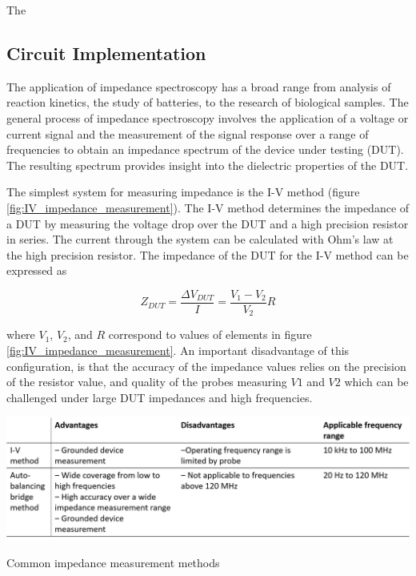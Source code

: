 \par The 
 
 \subsection*{Circuit Implementation}
 \par The application of impedance spectroscopy has a broad range from analysis of reaction kinetics, the study of batteries, to the research of biological samples. The general process of impedance spectroscopy involves the application of a voltage or current signal and the measurement of the signal response over a range of frequencies to obtain an impedance spectrum of the device under testing (DUT). The resulting spectrum provides insight into the dielectric properties of the DUT. 
 
 \par The simplest system for measuring impedance is the I-V method (figure \ref{fig:IV_impedance_measurement}). The I-V method determines the impedance of a DUT by measuring the voltage drop over the DUT and a high precision resistor in series. The current through the system can be calculated with Ohm's law at the high precision resistor. The impedance of the DUT for the I-V method can be expressed as 
 
 \begin{equation}
     Z_{DUT} = \frac{\Delta V_{DUT}}{I} = \frac{V_1 - V_2}{V_2}R
     \label{eqn:IV_Z}
 \end{equation}
 
 \noindent where $V_1$, $V_2$, and $R$ correspond to values of elements in figure \ref{fig:IV_impedance_measurement}. An important disadvantage of this configuration, is that the accuracy of the impedance values relies on the precision of the resistor value, and quality of the probes measuring $V1$ and $V2$ which can be challenged under large DUT impedances and high frequencies.
 
 \begin{table}[ht]
    \centering
    \includegraphics[width=\textwidth]{images/impedanceMeasurementMethods.png}
    \caption[Common impedance measurement methods]{Common impedance measurement methods \cite{keysight_technologies_impedance_2015}}
    \label{tab:z_measurement_methods}
 \end{table}
 
